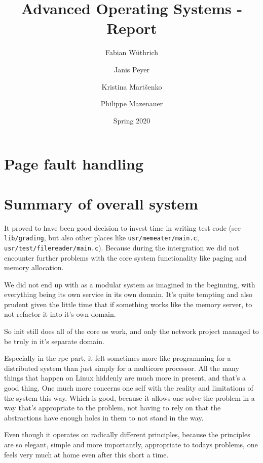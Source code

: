 \documentclass[11pt,a4paper]{report}
\begin{document}
\title{Advanced Operating Systems - Report}
\author{
Fabian W{\" u}thrich
\and
Janis Peyer 
\and
Kristina Mart{\v s}enko
\and
Philippe Mazenauer
}
\date{Spring 2020}

\maketitle

\tableofcontents

\listoffigures

\listoftables

\clearpage









\chapter{Page fault handling}














\chapter{Summary of overall system}

It proved to have been good decision to invest time in writing test code
(see \verb|lib/grading|, but also other places like \verb|usr/memeater/main.c|,
\verb|usr/test/filereader/main.c|).
Because during the intergration we did not encounter further problems with the
core system functionality like paging and memory allocation.

We did not end up with as a modular system as imagined in the beginning, with
everything being its own service in its own domain.
It's quite tempting and also prudent given the little time that if something
works like the memory server, to not refactor it into it's own domain.

So init still does all of the core os work, and only the network project managed
to be truly in it's separate domain.

Especially in the rpc part, it felt sometimes more like programming for a
distributed system than just simply for a multicore processor.
All the many things that happen on Linux hiddenly are much more in present, and
that's a good thing.
One much more concerns one self with the reality and limitations of the system
this way.
Which is good, because it allows one solve the problem in a way that's
appropriate to the problem, not having to rely on that the abstractions have
enough holes in them to not stand in the way.

Even though it operates on radically different principles, because the
principles are so elegant, simple and more importantly, appropriate to todays
problems, one feels very much at home even after this short a time.

\appendix



\printbibliography
\end{document}
